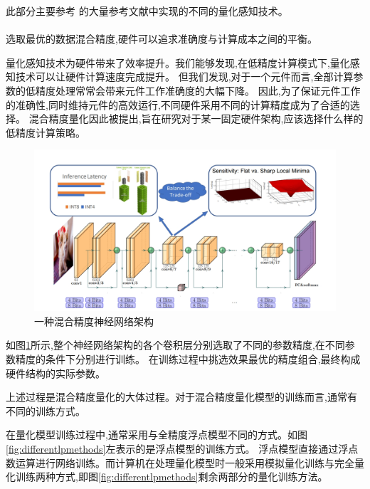 此部分主要参考  的大量参考文献中实现的不同的量化感知技术。

\paragraph{}

选取最优的数据混合精度,硬件可以追求准确度与计算成本之间的平衡。

量化感知技术为硬件带来了效率提升。我们能够发现,在低精度计算模式下,量化感知技术可以让硬件计算速度完成提升。
但我们发现,对于一个元件而言,全部计算参数的低精度处理常常会带来元件工作准确度的大幅下降。
因此,为了保证元件工作的准确性,同时维持元件的高效运行,不同硬件采用不同的计算精度成为了合适的选择。
混合精度量化因此被提出,旨在研究对于某一固定硬件架构,应该选择什么样的低精度计算策略。

\begin{center}
    \begin{figure}[ht!]
        \centering
        \includegraphics[scale = 0.5]{figures/multprecision.png}
        \caption{一种混合精度神经网络架构}
        \label{fig:multprecision}
    \end{figure}
\end{center}

如图\ref{fig:multprecision}所示,整个神经网络架构的各个卷积层分别选取了不同的参数精度,在不同参数精度的条件下分别进行训练。
在训练过程中挑选效果最优的精度组合,最终构成硬件结构的实际参数。

上述过程是混合精度量化的大体过程。对于混合精度量化模型的训练而言,通常有不同的训练方式。

在量化模型训练过程中,通常采用与全精度浮点模型不同的方式。如图\ref{fig:differentlpmethods}左表示的是浮点模型的训练方式。
浮点模型直接通过浮点数运算进行网络训练。而计算机在处理量化模型时一般采用模拟量化训练与完全量化训练两种方式,即图\ref{fig:differentlpmethods}剩余两部分的量化训练方法。


